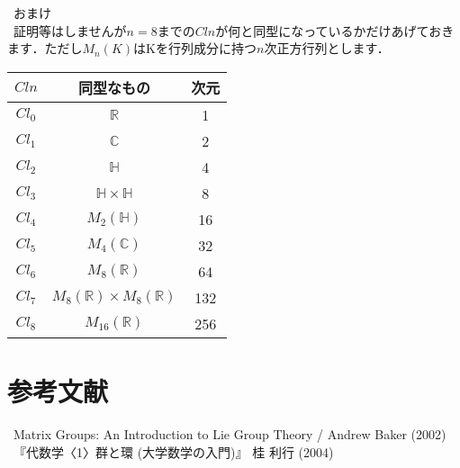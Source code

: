 \documentclass[./main]{subfiles} %
\theoremstyle{idefinition}
\begin{document}
\ おまけ\\
\ 証明等はしませんが$n=8$までの$Cln$が何と同型になっているかだけあげておきます．ただし$M_n(K)$はKを行列成分に持つ$n$次正方行列とします．\\
\begin{center}
\begin{tabular}{|c|c|c|}\hline
$Cln$ & 同型なもの & 次元 \\\hline
$Cl_0$ & $\mathbb{R}$ & 1 \\\hline
$Cl_1$ & $\mathbb{C}$ & 2 \\\hline
$Cl_2$ & $\mathbb{H}$ & 4 \\\hline
$Cl_3$ & $\mathbb{H}\times \mathbb{H}$ & 8 \\\hline
$Cl_4$ & $M_2(\mathbb{H})$ & 16 \\\hline
$Cl_5$ & $M_4(\mathbb{C})$ & 32 \\\hline
$Cl_6$ & $M_8(\mathbb{R})$ & 64 \\\hline
$Cl_7$ & $M_8(\mathbb{R}) \times M_8(\mathbb{R})$ & 132 \\\hline
$Cl_8$ & $M_{16}(\mathbb{R})$ & 256 \\\hline
\end{tabular}
\end{center}


\section{参考文献}
\ Matrix Groups: An Introduction to Lie Group Theory / Andrew Baker (2002) \\
\ 『代数学〈1〉群と環 (大学数学の入門)』  桂 利行 (2004)
\end{document}
